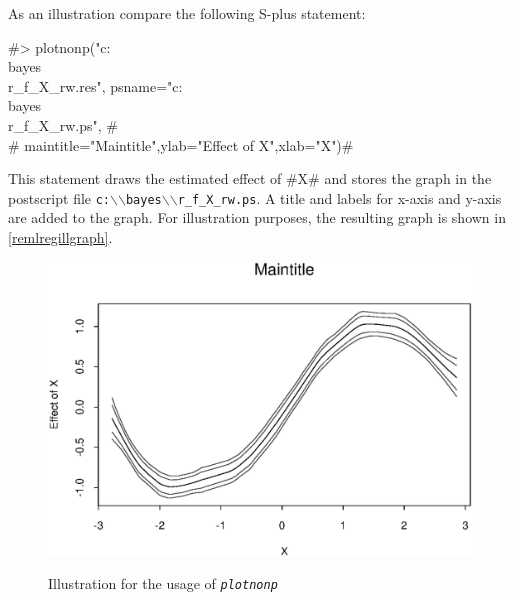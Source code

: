 As an illustration compare the following S-plus statement:

#> plotnonp("c:\\bayes\\r_f_X_rw.res", psname="c:\\bayes\\r_f_X_rw.ps", #\\
#  maintitle="Maintitle",ylab="Effect of X",xlab="X")#

This statement draws the estimated effect of #X# and stores the
graph in the postscript file
\texttt{c:$\backslash$$\backslash$bayes$\backslash$$\backslash$r\_f\_X\_rw.ps}.
A title and labels for x-axis and y-axis are added to the graph.
For illustration purposes, the resulting graph is shown in
\autoref{remlregillgraph}.

\begin{figure}[ht]
\begin{center}
\includegraphics[scale=0.8]{grafiken/remlregplotnonp.eps}
{\em \caption{ \label{remlregillgraph} Illustration for the usage
of \em\texttt{plotnonp}}}
\end{center}
\end{figure}

